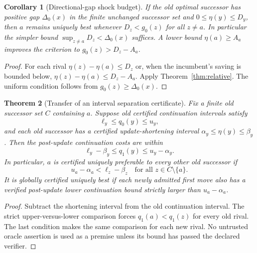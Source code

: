\documentclass[11pt]{article}
\newtheorem{theorem}{Theorem}[section]
\newtheorem{corollary}[theorem]{Corollary}
\theoremstyle{definition}\newtheorem{definition}[theorem]{Definition}\newtheorem{assumption}[theorem]{Assumption}
\theoremstyle{remark}\newtheorem{remark}[theorem]{Remark}
\begin{document}
\begin{corollary}[Directional-gap shock budget]\label{cor:gapbudget}
If the old optimal successor has positive gap $\Delta_0(x)$ in the finite unchanged successor set and $0\leq\eta(y)\leq D_y$, then $a$ remains uniquely best whenever $D_z<g_0(z)$ for all $z\neq a$. In particular the simpler bound $\sup_{z\neq a}D_z<\Delta_0(x)$ suffices. A lower bound $\eta(a)\geq A_a$ improves the criterion to $g_0(z)>D_z-A_a$.
\end{corollary}
\begin{proof}
For each rival $\eta(z)-\eta(a)\leq D_z$ or, when the incumbent's saving is bounded below, $\eta(z)-\eta(a)\leq D_z-A_a$. Apply Theorem~\ref{thm:relative}. The uniform condition follows from $g_0(z)\geq\Delta_0(x)$.
\end{proof}
\par


\begin{theorem}[Transfer of an interval separation certificate]\label{thm:intervaltransfer}
Fix a finite old successor set $C$ containing $a$. Suppose old certified continuation intervals satisfy
\[
\ell_y\leq q_0(y)\leq u_y,
\]
and each old successor has a certified update-shortening interval $\alpha_y\leq\eta(y)\leq\beta_y$. Then the post-update continuation costs are within
\[
\ell_y-\beta_y\leq q_1(y)\leq u_y-\alpha_y.
\]
In particular, $a$ is certified uniquely preferable to every other old successor if
\[
\boxed{u_a-\alpha_a<\ell_z-\beta_z\quad\text{for all }z\in C\setminus\{a\}.}
\]
It is globally certified uniquely best if each newly admitted first move also has a verified post-update lower continuation bound strictly larger than $u_a-\alpha_a$.
\end{theorem}
\begin{proof}
Subtract the shortening interval from the old continuation interval. The strict upper-versus-lower comparison forces $q_1(a)<q_1(z)$ for every old rival. The last condition makes the same comparison for each new rival. No untrusted oracle assertion is used as a premise unless its bound has passed the declared verifier.
\end{proof}
\par
\end{document}
